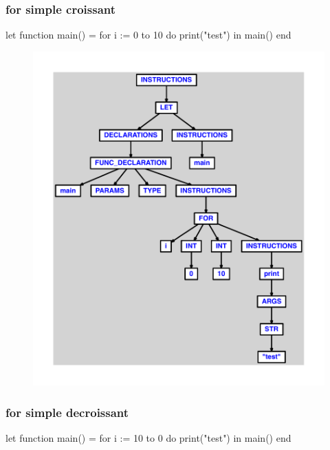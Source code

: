 \documentclass{article}
\begin{document}
\subsubsection{for simple croissant}
\begin{verbatimtab}
let
	function main() =
		for i := 0 to 10 do
			print("test")
in main() end
\end{verbatimtab}
\begin{figure}[H]\centering\includegraphics[max width=\textwidth]{ast/ast_196.pdf}\end{figure}\subsubsection{for simple decroissant}
\begin{verbatimtab}
let
	function main() =
		for i := 10 to 0 do
			print("test")
in main() end
\end{verbatimtab}
\end{document}
